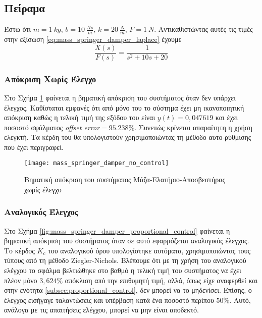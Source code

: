 \subsection{Πείραμα}

Έστω ότι $\displaystyle m = 1\ kg$, $\displaystyle b = 10\ \frac{Ns}{m}$, $\displaystyle k = 20\ \frac{N}{m}$, $\displaystyle F = 1\ N$. Αντικαθιστώντας αυτές τις τιμές στην εξίσωση \ref{eq:mass_springer_damper_laplace} έχουμε
\begin{equation}
\frac{X(s)}{F(s)} = \frac{1}{s^2 + 10s + 20}
\end{equation}

\subsubsection{Απόκριση Χωρίς Έλεγχο}

Στο Σχήμα \ref{fig:mass_springer_damper_no_control} φαίνεται η βηματική απόκριση του συστήματος όταν δεν υπάρχει έλεγχος. Καθίσταται εμφανές ότι από μόνο του το σύστημα έχει μη ικανοποιητική απόκριση καθώς η τελική τιμή της εξόδου του είναι $y(t) = 0,047619$ και έχει ποσοστό σφάλματος \textit{offset error}$= 95.238 \%$. Συνεπώς κρίνεται απαραίτητη η χρήση ελεγκτή. Τα κέρδη του θα υπολογιστούν χρησιμοποιώντας τη μέθοδο αυτο-ρύθμισης που έχει περιγραφεί.

\begin{figure}[h]
  \centering
  \texttt{[image: mass\_springer\_damper\_no\_control]}
  \caption{Βηματική απόκριση του συστήματος Μάζα-Ελατήριο-Αποσβεστήρας χωρίς έλεγχο}
  \label{fig:mass_springer_damper_no_control}
\end{figure}

\subsubsection{Αναλογικός Έλεγχος}

Στο Σχήμα \ref{fig:mass_springer_damper_proportional_control} φαίνεται η βηματική απόκριση του συστήματος όταν σε αυτό εφαρμόζεται αναλογικός έλεγχος. Το κέρδος $K_c$ του αναλογικού όρου υπολογίστηκε αυτόματα, χρησιμοποιώντας τους τύπους από τη μέθοδο Ziegler-Nichols. Βλέπουμε ότι με τη χρήση του αναλογικού ελέγχου το σφάλμα βελτιώθηκε στο βαθμό η τελική τιμή του συστήματος να έχει πλέον μόνο $3,624\%$ απόκλιση από την επιθυμητή τιμή, αλλά, όπως είχε αναφερθεί και στην ενότητα \ref{subsec:proportional_control}, δεν μπορεί να το μηδενίσει. Επίσης, ο έλεγχος εισήγαγε ταλαντώσεις και υπέρβαση κατά ένα ποσοστό περίπου $50\%$. Αυτό, ανάλογα με τις απαιτήσεις ελέγχου, μπορεί να μην είναι αποδεκτό.

